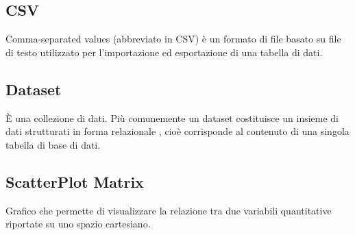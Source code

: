 \documentclass[../manuale_utente.tex]{subfiles}
\begin{document}
\subsection*{CSV}
{}
Comma-separated values (abbreviato in CSV) è un formato di file basato su file di testo utilizzato per l'importazione ed esportazione di una tabella di dati.

\subsection*{Dataset}
{}
È una collezione di dati. Più comunemente un dataset costituisce un insieme di dati strutturati in forma relazionale , cioè corrisponde al contenuto di una singola tabella di base di dati.

\subsection*{ScatterPlot Matrix}
{}
Grafico che permette di visualizzare la relazione tra due variabili quantitative riportate su uno spazio cartesiano.
\end{document}
